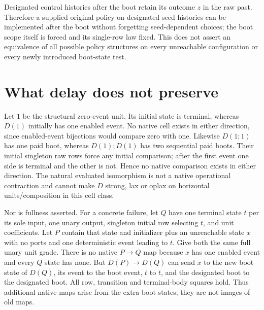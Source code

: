 \documentclass[11pt]{article}
\begin{document}
Designated control histories after the boot retain its outcome $z$ in the
raw past. Therefore a supplied original policy on designated seed histories
can be implemented after the boot without forgetting seed-dependent choices;
the boot scope itself is forced and its single-row law fixed. This does not
assert an equivalence of all possible policy structures on every unreachable
configuration or every newly introduced boot-state test.

\section{What delay does not preserve}
Let $1$ be the structural zero-event unit. Its initial state is terminal,
whereas $D(1)$ initially has one enabled event. No native cell exists in either
direction, since enabled-event bijections would compare zero with one.
Likewise $D(1;1)$ has one paid boot, whereas $D(1);D(1)$ has two sequential
paid boots. Their initial singleton raw rows force any initial comparison;
after the first event one side is terminal and the other is not. Hence no
native comparison exists in either direction. The natural evaluated
isomorphism is not a native operational contraction and cannot make $D$
strong, lax or oplax on horizontal units/composition in this cell class.

Nor is fullness asserted. For a concrete failure, let $Q$ have one terminal
state $t$ per its sole input, one unary output, singleton initial row selecting
$t$, and unit coefficients. Let $P$ contain that state and initializer plus
an unreachable state $x$ with no ports and one deterministic event leading
to $t$. Give both the same full unary unit grade. There is no native $P\to Q$
map because $x$ has one enabled event and every $Q$ state has none. But
$D(P)\to D(Q)$ can send $x$ to the new boot state of $D(Q)$, its event to the
boot event, $t$ to $t$, and the designated boot to the designated boot.
All row, transition and terminal-body squares hold. Thus additional native
maps arise from the extra boot states; they are not images of old maps.
\end{document}
